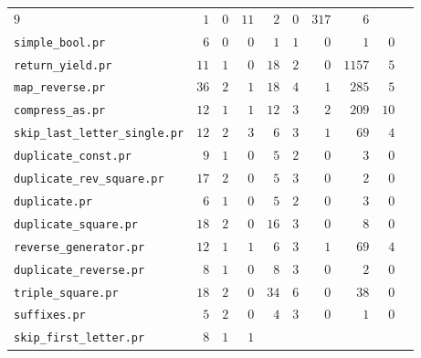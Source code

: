 \begin{tabular}{l|rrr|rrr|rrr}
        $ 9 $ & $ 1 $ & $ 0 $ &
            $ 11    $ & $ 2  $ & $ 0 $  &
         $ 317 $ & $ 6 $  \\
            \texttt{simple\_bool.pr} &
        $ 6 $ & $ 0 $ & $ 0 $ &
            $ 1    $ & $ 1  $ & $ 0 $  &
         $ 1 $ & $ 0 $  \\
            \texttt{return\_yield.pr} &
        $ 11 $ & $ 1 $ & $ 0 $ &
            $ 18    $ & $ 2  $ & $ 0 $  &
         $ 1157 $ & $ 5 $  \\
            \texttt{map\_reverse.pr} &
        $ 36 $ & $ 2 $ & $ 1 $ &
            $ 18    $ & $ 4  $ & $ 1 $  &
         $ 285 $ & $ 5 $  \\
            \texttt{compress\_as.pr} &
        $ 12 $ & $ 1 $ & $ 1 $ &
            $ 12    $ & $ 3  $ & $ 2 $  &
         $ 209 $ & $ 10 $  \\
            \texttt{skip\_last\_letter\_single.pr} &
        $ 12 $ & $ 2 $ & $ 3 $ &
            $ 6    $ & $ 3  $ & $ 1 $  &
         $ 69 $ & $ 4 $  \\
            \texttt{duplicate\_const.pr} &
        $ 9 $ & $ 1 $ & $ 0 $ &
            $ 5    $ & $ 2  $ & $ 0 $  &
         $ 3 $ & $ 0 $  \\
            \texttt{duplicate\_rev\_square.pr} &
        $ 17 $ & $ 2 $ & $ 0 $ &
            $ 5    $ & $ 3  $ & $ 0 $  &
         $ 2 $ & $ 0 $  \\
            \texttt{duplicate.pr} &
        $ 6 $ & $ 1 $ & $ 0 $ &
            $ 5    $ & $ 2  $ & $ 0 $  &
         $ 3 $ & $ 0 $  \\
            \texttt{duplicate\_square.pr} &
        $ 18 $ & $ 2 $ & $ 0 $ &
            $ 16    $ & $ 3  $ & $ 0 $  &
         $ 8 $ & $ 0 $  \\
            \texttt{reverse\_generator.pr} &
        $ 12 $ & $ 1 $ & $ 1 $ &
            $ 6    $ & $ 3  $ & $ 1 $  &
         $ 69 $ & $ 4 $  \\
            \texttt{duplicate\_reverse.pr} &
        $ 8 $ & $ 1 $ & $ 0 $ &
            $ 8    $ & $ 3  $ & $ 0 $  &
         $ 2 $ & $ 0 $  \\
            \texttt{triple\_square.pr} &
        $ 18 $ & $ 2 $ & $ 0 $ &
            $ 34    $ & $ 6  $ & $ 0 $  &
         $ 38 $ & $ 0 $  \\
            \texttt{suffixes.pr} &
        $ 5 $ & $ 2 $ & $ 0 $ &
            $ 4    $ & $ 3  $ & $ 0 $  &
         $ 1 $ & $ 0 $  \\
            \texttt{skip\_first\_letter.pr} &
        $ 8 $ & $ 1 $ & $ 1 $ &

\end{tabular}
